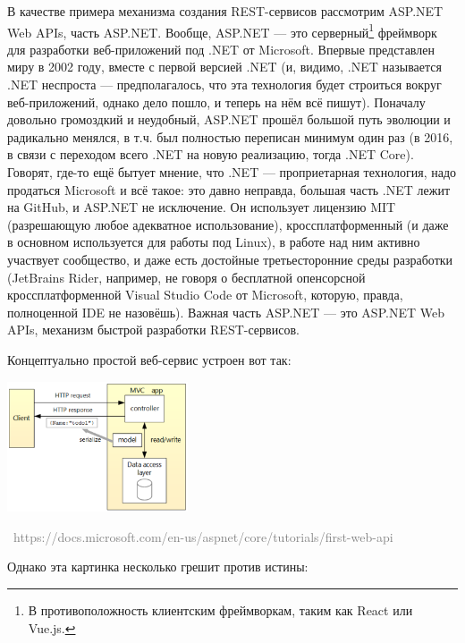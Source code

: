 \documentclass[a5paper]{article}
\newcommand{\attribution}[1] {
    \vspace{-5mm}\begin{flushright}\begin{scriptsize}\textcolor{gray}{\textcopyright\, #1}\end{scriptsize}\end{flushright}
}
\begin{document}
В качестве примера механизма создания REST-сервисов рассмотрим ASP.NET Web APIs, часть ASP.NET. Вообще, ASP.NET --- это серверный\footnote{В противоположность клиентским фреймворкам, таким как React или Vue.js.} фреймворк для разработки веб-приложений под .NET от Microsoft. Впервые представлен миру в 2002 году, вместе с первой версией .NET (и, видимо, .NET называется .NET неспроста --- предполагалось, что эта технология будет строиться вокруг веб-приложений, однако дело пошло, и теперь на нём всё пишут). Поначалу довольно громоздкий и неудобный, ASP.NET прошёл большой путь эволюции и радикально менялся, в т.ч. был полностью переписан минимум один раз (в 2016, в связи с переходом всего .NET на новую реализацию, тогда .NET Core). Говорят, где-то ещё бытует мнение, что .NET --- проприетарная технология, надо продаться Microsoft и всё такое: это давно неправда, большая часть .NET лежит на GitHub, и ASP.NET не исключение. Он использует лицензию MIT (разрешающую любое адекватное использование), кроссплатформенный (и даже в основном используется для работы под Linux), в работе над ним активно участвует сообщество, и даже есть достойные третьесторонние среды разработки (JetBrains Rider, например, не говоря о бесплатной опенсорсной кроссплатформенной Visual Studio Code от Microsoft, которую, правда, полноценной IDE не назовёшь). Важная часть ASP.NET --- это ASP.NET Web APIs, механизм быстрой разработки REST-сервисов.

Концептуально простой веб-сервис устроен вот так:

\begin{center}
    \includegraphics[width=0.4\textwidth]{webApiServiceDesign.png}
    \attribution{https://docs.microsoft.com/en-us/aspnet/core/tutorials/first-web-api}
\end{center}

Однако эта картинка несколько грешит против истины:
\end{document}

